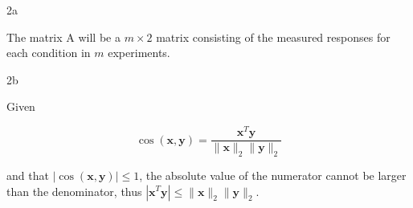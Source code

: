 \documentclass{article}
\begin{document}
\begin{homeworkProblem}

    \begin{homeworkSection}{2a}
        
        The matrix A will be a $m \times 2$ matrix consisting of the measured
        responses for each condition in $m$ experiments.

    \end{homeworkSection}

    \begin{homeworkSection}{2b}

        

    \end{homeworkSection}

\end{homeworkProblem}

\begin{homeworkProblem}

    Given 
    
    \begin{equation}
        \cos(\bm{x},\bm{y}) = \frac{\bm{x}^T\bm{y}}{\|\bm{x}\|_2 \|\bm{y}\|_2}
    \end{equation}

    \noindent and that $|\cos(\bm{x},\bm{y})| \leq 1$, the absolute value of
    the numerator cannot be larger than the denominator, thus $|\bm{x}^T\bm{y}|
    \leq \|\bm{x}\|_2 \|\bm{y}\|_2$.

\end{homeworkProblem}
\end{document}
